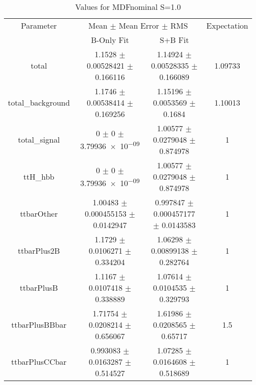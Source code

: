 \begin{table}
\centering
\caption{Values for MDFnominal S=1.0}
\begin{tabular}{cccc}
\toprule
Parameter & \multicolumn{2}{c}{Mean $\pm$ Mean Error $\pm$ RMS} & Expectation\\
 & B-Only Fit & S+B Fit & \\
\midrule
total & \num{1.1528} $\pm$ \num{0.00528421} $\pm$ \num{0.166116} & \num{1.14924} $\pm$ \num{0.00528335} $\pm$ \num{0.166089} & \num{1.09733}\\
total\_background & \num{1.1746} $\pm$ \num{0.00538414} $\pm$ \num{0.169256} & \num{1.15196} $\pm$ \num{0.0053569} $\pm$ \num{0.1684} & \num{1.10013}\\
total\_signal & \num{0} $\pm$ \num{0} $\pm$ \num{3.79936e-09} & \num{1.00577} $\pm$ \num{0.0279048} $\pm$ \num{0.874978} & \num{1}\\
ttH\_hbb & \num{0} $\pm$ \num{0} $\pm$ \num{3.79936e-09} & \num{1.00577} $\pm$ \num{0.0279048} $\pm$ \num{0.874978} & \num{1}\\
ttbarOther & \num{1.00483} $\pm$ \num{0.000455153} $\pm$ \num{0.0142947} & \num{0.997847} $\pm$ \num{0.000457177} $\pm$ \num{0.0143583} & \num{1}\\
ttbarPlus2B & \num{1.1729} $\pm$ \num{0.0106271} $\pm$ \num{0.334204} & \num{1.06298} $\pm$ \num{0.00899138} $\pm$ \num{0.282764} & \num{1}\\
ttbarPlusB & \num{1.1167} $\pm$ \num{0.0107418} $\pm$ \num{0.338889} & \num{1.07614} $\pm$ \num{0.0104535} $\pm$ \num{0.329793} & \num{1}\\
ttbarPlusBBbar & \num{1.71754} $\pm$ \num{0.0208214} $\pm$ \num{0.656067} & \num{1.61986} $\pm$ \num{0.0208565} $\pm$ \num{0.65717} & \num{1.5}\\
ttbarPlusCCbar & \num{0.993083} $\pm$ \num{0.0163287} $\pm$ \num{0.514527} & \num{1.07285} $\pm$ \num{0.0164608} $\pm$ \num{0.518689} & \num{1}\\
\bottomrule
\end{tabular}
\end{table}